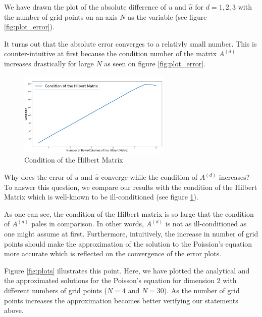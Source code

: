 \documentclass[refman]{article}
\theoremstyle{definition}
\begin{document}
We have drawn the plot of the absolute difference of \(u\) and \(\hat{u}\) for \(d = 1, 2, 3\) with the number of grid points on an axis \(N\) as the variable (see figure \ref{fig:plot_error}).

It turns out that the absolute error converges to a relativly small number. This is counter-intuitive at first because the condition number of the matrix \(A^{(d)}\) increases drastically for large \(N\) as seen on figure \ref{fig:plot_error}.

\begin{figure}
	\includegraphics[width=0.65\textwidth]{graphics/hilbert_condition.png}
	\caption{Condition of the Hilbert Matrix}
	\label{fig:hilbert_condition}
\end{figure}

Why does the error of \(u\) and \(\hat{u}\) converge while the condition of \(A^{(d)}\) increases? To answer this question, we compare our results with the condition of the Hilbert Matrix which is well-known to be ill-conditioned (see figure \ref{fig:hilbert_condition}).

As one can see, the condition of the Hilbert matrix is so large that the condition of \(A^{(d)}\) pales in comparison. In other words, \(A^{(d)}\) is not as ill-conditioned as one might assume at first. Furthermore, intuitively, the increase in number of grid points should make the approximation of the solution to the Poission's equation more accurate which is reflected on the convergence of the error plots.

Figure \ref{fig:plots} illustrates this point. Here, we have plotted the analytical and the approximated solutions for the Poisson's equation for dimension 2 with different numbers of grid points (\(N = 4\) and \(N = 30\)). As the number of grid points increases the approximation becomes better verifying our statements above.
\end{document}
